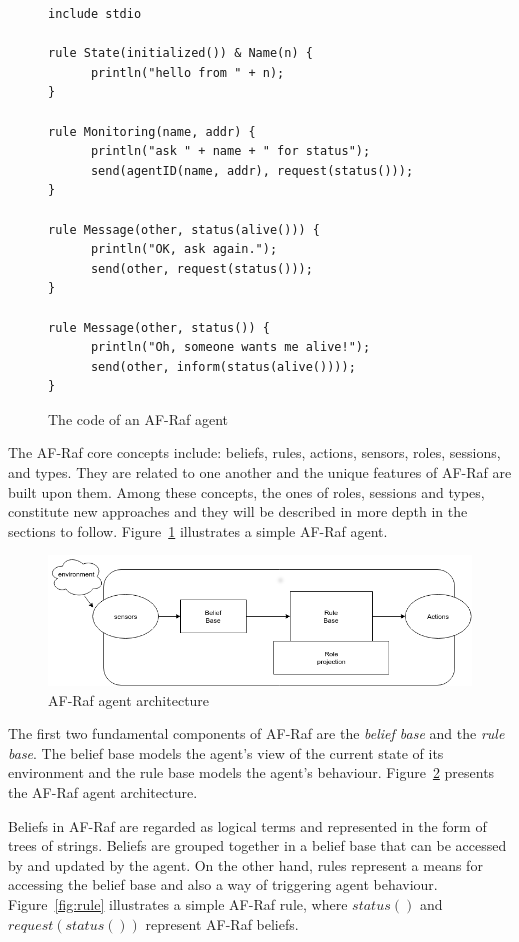 \documentclass[a4paper,12pt,oneside,fleqn]{book} %
\begin{document}
{\begin{figure}\footnotesize %
\begin{verbatim}
include stdio

rule State(initialized()) & Name(n) {
      println("hello from " + n);
}

rule Monitoring(name, addr) {
      println("ask " + name + " for status");
      send(agentID(name, addr), request(status()));
}

rule Message(other, status(alive())) {
      println("OK, ask again.");
      send(other, request(status()));
}

rule Message(other, status()) {
      println("Oh, someone wants me alive!");
      send(other, inform(status(alive())));
}
\end{verbatim}
\caption{The code of an AF-Raf agent}
\label{fig:AF-Raf}
\end{figure} %

The AF-Raf core concepts include: beliefs, rules, actions, sensors, roles,
sessions, and types. They are related to one another and the unique
features of AF-Raf are built upon them. Among these concepts, the ones of
roles, sessions and types, constitute new approaches and they will be
described in more depth in the sections to follow. Figure~\ref{fig:AF-Raf}
illustrates a simple AF-Raf agent.

\begin{figure}\footnotesize %
\includegraphics{AF-RafArchitecture2.png}
\caption{AF-Raf agent architecture}
\label{fig:AF-RafArch}
\end{figure} %

The first two fundamental components of AF-Raf are the \textit{belief base}
and the \textit{rule base}. The belief base models the agent's view of the
current state of its environment and the rule base models the agent's
behaviour. Figure~\ref{fig:AF-RafArch} presents the AF-Raf agent
architecture.

Beliefs in AF-Raf are regarded as logical terms and represented in the form
of trees of strings. Beliefs are grouped together in a belief base that can
be accessed by and updated by the agent. On the other hand, rules
represent a means for accessing the belief base and also a way of
triggering agent behaviour. Figure~\ref{fig:rule} illustrates a simple
AF-Raf rule, where $status()$ and $request(status())$ represent AF-Raf
beliefs.

}
\end{document}
